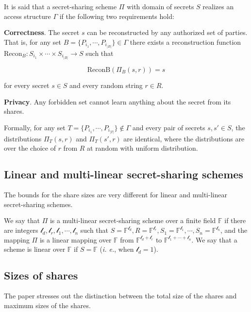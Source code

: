 It is said that a secret-sharing scheme $\Pi$ with domain of secrets $S$ realizes an access structure $\Gamma$ if the following two requirements hold:

\textbf{Correctness}. The secret $s$ can be reconstructed by any authorized set of parties.
That is, for any set $B = \{P_{i_1}, \cdots, P_{i_{|B|}}\} \in \Gamma$ there exists a reconstruction
function $\text{Recon}_B : S_{i_1} \times \cdots \times S_{i_{|B|}} \rightarrow S$ such that

$$\text{ReconB} (\Pi_B (s, r)) = s$$

for every secret $s \in S$ and every random string $r \in R$.

\textbf{Privacy}. Any forbidden set cannot learn anything about the secret from its shares.

Formally, for any set $T = \{P_{i_1}, \cdots, P_{i_{|T|}}\} \notin \Gamma$ and 
every pair of secrets $s, s' \in S$,
the distributions $\Pi_T (s, r)$ and $\Pi_T (s', r)$ are identical,
where the distributions are over the choice of $r$ from $R$ at random with uniform distribution.

\subsection{Linear and multi-linear secret-sharing schemes}

The bounds for the share sizes are very different for linear and multi-linear secret-sharing schemes.

We say that $\Pi$ is a multi-linear secret-sharing scheme over a finite field $\mathbb{F}$ if there are integers
$\mathcal{l}_d, \mathcal{l}_r , \mathcal{l}_1 , \cdots , \mathcal{l}_n$ such that $S = \mathbb{F}^{\mathcal{l}_d} , R = \mathbb{F}^{\mathcal{l}_r} , S_1 = \mathbb{F}^{\mathcal{l}_1} , \cdots , S_n = \mathbb{F}^{\mathcal{l}_n}$,
and the mapping $\Pi$ is a linear mapping over $\mathbb{F}$ from $\mathbb{F}^{\mathcal{l}_d + \mathcal{l}_r}$ to $\mathbb{F}^{\mathcal{l}_1 + \cdots + \mathcal{l}_n}$.
We say that a scheme is linear over $\mathbb{F}$ if $S = \mathbb{F}$ (\textit{i. e.}, when $\mathcal{l}_d = 1$).

\subsection{Sizes of shares}

The paper stresses out the distinction between the total size of the shares and maximum sizes of the shares.


